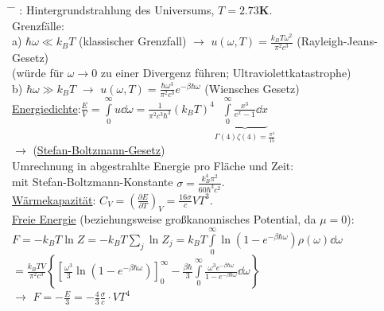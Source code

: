 \begin{figure}[H]
  \centering
\end{figure}
\begin{tabbing}
\hspace{4em} \= \hspace{4em} \= \kill
{}: Hintergrundstrahlung des Universums, $T = 2.73\textbf{K}$.\\
Grenzfälle:\\
a)\> $\hbar \omega \ll k_B T$ (klassischer Grenzfall) $\rightarrow$ $u(\omega, T) = \frac{k_B T \omega^2}{\pi^2 c^3}$ (Rayleigh-Jeans-Gesetz)\\
\> (würde für $\omega\to 0$ zu einer Divergenz führen; \glqq Ultraviolettkatastrophe\grqq )\\
b)\> $\hbar\omega \gg k_B T$ $\rightarrow$ $u(\omega,T) = \frac{\hbar\omega^3}{\pi^2 c^3}e^{-\beta \hbar \omega}$ (Wiensches Gesetz)\\
\underline{Energiedichte}:$\frac{E}{V} = \int\limits_0^{\infty} u \dd{\omega} = \frac{1}{\pi^2 c^3\hbar^3} (k_B T)^4 \underbrace{\int\limits_0^{\infty}\frac{x^3}{e^x-1}\dd{x}}_{\Gamma(4)\zeta(4) = \frac{\pi^4}{15}}$\\
$\rightarrow$\>  (\underline{Stefan-Boltzmann-Gesetz})\\
Umrechnung in abgestrahlte Energie pro Fläche und Zeit:\\
\>  mit Stefan-Boltzmann-Konstante $\sigma = \frac{k_B^4\pi^2}{60 \hbar^3c^2}$.\\
\underline{Wärmekapazität}: $C_V = \left(\frac{\partial E}{\partial T}\right)_V = \frac{16\sigma}{c} V T^3$.\\
\underline{Freie Energie} (beziehungsweise großkanonnisches Potential, da $\mu = 0$):\\
\> $F = - k_B T \ln Z = - k_B T \sum\limits_j \ln Z_j = k_B T \int\limits_0^{\infty} \ln\left(1-e^{-\beta\hbar\omega}\right)\rho(\omega)\dd{\omega}$\\
\>   $= \frac{k_B T V}{\pi^2 c^3}\left\{\left[\frac{\omega^3}{3}\ln\left(1-e^{-\beta\hbar\omega}\right)\right]_0^{\infty} - \frac{\beta\hbar}{3}\int\limits_0^{\infty}\frac{\omega^3 e^{-\beta\hbar\omega}}{1 - e^{-\beta\hbar\omega}}\dd{\omega}\right\}$\\
$\rightarrow$\> $F = -\frac{E}{3} = -\frac{4}{3}\frac{\sigma}{c}\cdot V T^4$
\end{tabbing}
